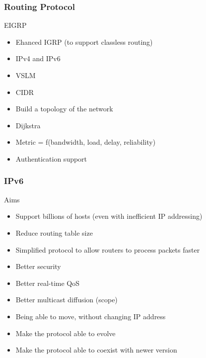   \begin{frame}
    \frametitle{Routing Protocol}
    \begin{center}EIGRP \end{center}
      \begin{itemize}
        \item Ehanced IGRP (to support classless routing) \pause
        \item IPv4 and IPv6 \pause
        \item VSLM \pause
        \item CIDR \pause
        \item Build a topology of the network \pause
        \item Dijkstra \pause
        \item Metric = f(bandwidth, load, delay, reliability) \pause
        \item Authentication support
      \end{itemize}
  \end{frame}

  \begin{frame}
    \frametitle{IPv6}
    \begin{center}Aims \end{center}
    \begin{itemize}
      \item Support billions of hosts (even with inefficient IP addressing) \pause
      \item Reduce routing table size \pause
      \item Simplified protocol to allow routers to process packets faster \pause
      \item Better security \pause
      \item Better real-time QoS \pause
      \item Better multicast diffusion (scope) \pause
      \item Being able to move, without changing IP address \pause
      \item Make the protocol able to evolve \pause
      \item Make the protocol able to coexist with newer version
    \end{itemize}
  \end{frame}

